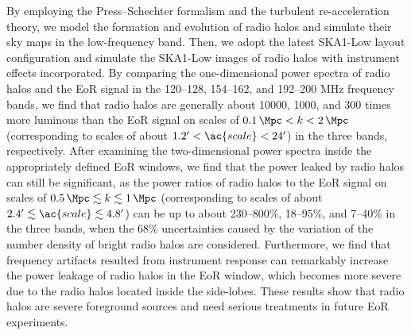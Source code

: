 \begin{englishabstract}
By employing the Press--Schechter formalism and the turbulent
re-acceleration theory, we model the formation and evolution of
radio halos and simulate their sky maps in the low-frequency band.
Then, we adopt the latest SKA1-Low layout configuration and simulate
the SKA1-Low images of radio halos with instrument effects incorporated.
By comparing the one-dimensional power spectra of radio halos and
the EoR signal in the \numrange{120}{128}, \numrange{154}{162},
and \numrange{192}{200} \si{\MHz} frequency bands, we find that
radio halos are generally about \num{10000}, 1000, and 300
times more luminous than the EoR signal on scales of
$\SI{0.1}{\per\Mpc} < k < \SI{2}{\per\Mpc}$
(corresponding to scales of about
$\SI{1.2}{\arcminute} < \ac{scale} < \SI{24}{\arcminute}$)
in the three bands, respectively.
After examining the two-dimensional power spectra inside the
appropriately defined EoR windows, we find that the power leaked by
radio halos can still be significant, as the power ratios of radio halos
to the EoR signal on scales of
$\SI{0.5}{\per\Mpc} \lesssim k \lesssim \SI{1}{\per\Mpc}$
(corresponding to scales of about
$\SI{2.4}{\arcminute} \lesssim \ac{scale} \lesssim \SI{4.8}{\arcminute}$)
can be up to about
\numrange{230}{800}\%, \numrange{18}{95}\%, and \numrange{7}{40}\%
in the three bands, when the 68\% uncertainties caused by the variation
of the number density of bright radio halos are considered.
Furthermore, we find that frequency artifacts resulted from instrument
response can remarkably increase the power leakage of radio halos in
the EoR window, which becomes more severe due to the radio halos
located inside the side-lobes.
These results show that radio halos are severe foreground sources
and need serious treatments in future EoR experiments.


\end{englishabstract}
